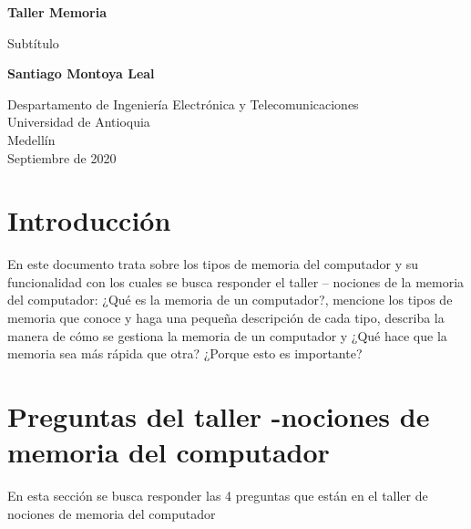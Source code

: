 \documentclass{article}
\begin{document}
\begin{titlepage}
    \begin{center}
        \vspace*{1cm}
            
        \Huge
        \textbf{Taller Memoria}
            
        \vspace{0.5cm}
        \LARGE
        Subtítulo
            
        \vspace{1.5cm}
            
        \textbf{Santiago Montoya Leal}
            
        \vfill
            
        \vspace{0.8cm}
            
        \Large
        Despartamento de Ingeniería Electrónica y Telecomunicaciones\\
        Universidad de Antioquia\\
        Medellín\\
        Septiembre de 2020
            
    \end{center}
\end{titlepage}

\tableofcontents
\newpage
\section{Introducción}\label{intro}
En este documento trata sobre los tipos de memoria del computador y su funcionalidad con los cuales se busca responder el taller – nociones de la memoria del computador: ¿Qué es la memoria de un computador?, mencione los tipos de memoria que conoce y haga una pequeña descripción de cada tipo, describa la manera de cómo se gestiona la memoria de un computador y ¿Qué hace que la memoria sea más rápida que otra? ¿Porque esto es importante?

\section{Preguntas del taller -nociones de memoria del computador} \label{contenido}
En esta sección se busca responder las 4 preguntas que están en el taller de nociones de memoria del computador
\end{document}
